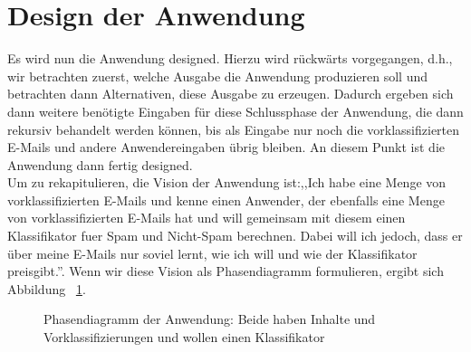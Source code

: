 \documentclass{article}
\theoremstyle{definition}
\theoremstyle{remark}
\begin{document}
\section{Design der Anwendung}
Es wird nun die Anwendung designed. Hierzu wird r\"uckw\"arts vorgegangen, d.h.,
wir betrachten zuerst, welche Ausgabe die Anwendung produzieren soll und 
betrachten dann Alternativen, diese Ausgabe zu erzeugen. Dadurch ergeben sich
dann weitere ben\"otigte Eingaben f\"ur diese Schlussphase der Anwendung, die
dann rekursiv behandelt werden k\"onnen, bis als Eingabe nur noch die 
vorklassifizierten E-Mails und andere Anwendereingaben \"ubrig bleiben.
An diesem Punkt ist die Anwendung dann fertig designed.\\
Um zu rekapitulieren, die Vision der Anwendung ist:,,Ich habe eine Menge von
vorklassifizierten E-Mails und kenne einen Anwender, der ebenfalls eine Menge
von vorklassifizierten E-Mails hat und will gemeinsam mit diesem einen 
Klassifikator fuer Spam und Nicht-Spam berechnen. Dabei will ich jedoch, dass
er \"uber meine E-Mails nur soviel lernt, wie ich will und wie der Klassifikator
preisgibt.''. Wenn wir diese Vision als Phasendiagramm formulieren, ergibt sich 
Abbildung ~\ref{fig:vision}.\\
\begin{figure}
\caption{Phasendiagramm der Anwendung: Beide haben Inhalte und Vorklassifizierungen und wollen einen Klassifikator}
\label{fig:vision}
\end{figure}
\end{document}
